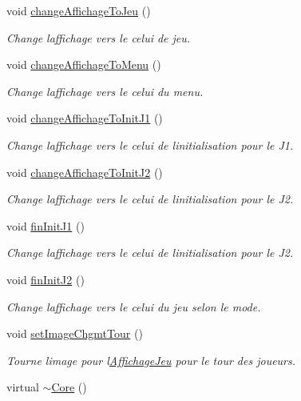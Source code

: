 \begin{DoxyCompactItemize}
void \hyperlink{class_core_aa9f91b5e846906e97f1ba479ae3c1cc1}{change\+Affichage\+To\+Jeu} ()
\begin{DoxyCompactList}\small\item\em Change l\textquotesingle{}affichage vers le celui de jeu. \end{DoxyCompactList}\item 
void \hyperlink{class_core_aa6e820eee8d7479036e082652474006e}{change\+Affichage\+To\+Menu} ()
\begin{DoxyCompactList}\small\item\em Change l\textquotesingle{}affichage vers le celui du menu. \end{DoxyCompactList}\item 
void \hyperlink{class_core_a3a83d27d66ff842b74f8399c483973b1}{change\+Affichage\+To\+Init\+J1} ()
\begin{DoxyCompactList}\small\item\em Change l\textquotesingle{}affichage vers le celui de l\textquotesingle{}initialisation pour le J1. \end{DoxyCompactList}\item 
void \hyperlink{class_core_a7dde7558331088ab7d57572477fc8f2b}{change\+Affichage\+To\+Init\+J2} ()
\begin{DoxyCompactList}\small\item\em Change l\textquotesingle{}affichage vers le celui de l\textquotesingle{}initialisation pour le J2. \end{DoxyCompactList}\item 
void \hyperlink{class_core_abc88e9e2f23f9df672ffc987ea29d329}{fin\+Init\+J1} ()
\begin{DoxyCompactList}\small\item\em Change l\textquotesingle{}affichage vers le celui de l\textquotesingle{}initialisation pour le J2. \end{DoxyCompactList}\item 
void \hyperlink{class_core_af10b83849055258108b9769617edb5e5}{fin\+Init\+J2} ()
\begin{DoxyCompactList}\small\item\em Change l\textquotesingle{}affichage vers le celui du jeu selon le mode. \end{DoxyCompactList}\item 
void \hyperlink{class_core_a0a45f16dc5613ac2239f8648befb59c4}{set\+Image\+Chgmt\+Tour} ()
\begin{DoxyCompactList}\small\item\em Tourne l\textquotesingle{}image pour l\textquotesingle{}\hyperlink{class_affichage_jeu}{Affichage\+Jeu} pour le tour des joueurs. \end{DoxyCompactList}\item 
virtual \hyperlink{class_core_a776f8c46504b14183883c6273f93eaed}{$\sim$\+Core} ()\hypertarget{class_core_a776f8c46504b14183883c6273f93eaed}{}\label{class_core_a776f8c46504b14183883c6273f93eaed}


\end{DoxyCompactItemize}
